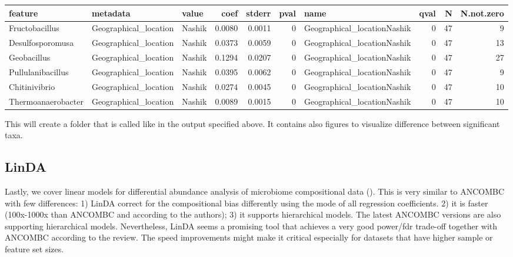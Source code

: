 \documentclass[
]{book}
\begin{document}
\begin{tabular}{l|l|l|r|r|r|l|r|r|r}
\hline
feature & metadata & value & coef & stderr & pval & name & qval & N & N.not.zero\\
\hline
Fructobacillus & Geographical\_location & Nashik & 0.0080 & 0.0011 & 0 & Geographical\_locationNashik & 0 & 47 & 9\\
\hline
Desulfosporomusa & Geographical\_location & Nashik & 0.0373 & 0.0059 & 0 & Geographical\_locationNashik & 0 & 47 & 13\\
\hline
Geobacillus & Geographical\_location & Nashik & 0.1294 & 0.0207 & 0 & Geographical\_locationNashik & 0 & 47 & 27\\
\hline
Pullulanibacillus & Geographical\_location & Nashik & 0.0395 & 0.0062 & 0 & Geographical\_locationNashik & 0 & 47 & 9\\
\hline
Chitinivibrio & Geographical\_location & Nashik & 0.0274 & 0.0045 & 0 & Geographical\_locationNashik & 0 & 47 & 10\\
\hline
Thermoanaerobacter & Geographical\_location & Nashik & 0.0089 & 0.0015 & 0 & Geographical\_locationNashik & 0 & 47 & 10\\
\hline
\end{tabular}

This will create a folder that is called like in the output specified
above. It contains also figures to visualize difference between
significant taxa.

\hypertarget{linda}{%
\subsection{LinDA}\label{linda}}

Lastly, we cover linear models for differential abundance analysis of
microbiome compositional data (\citet{Zhou2022}). This is very similar to
ANCOMBC with few differences: 1) LinDA correct for the compositional
bias differently using the mode of all regression coefficients. 2) it
is faster (100x-1000x than ANCOMBC and according to the authors); 3)
it supports hierarchical models. The latest ANCOMBC versions are also
supporting hierarchical models. Nevertheless, LinDA seems a promising
tool that achieves a very good power/fdr trade-off together with
ANCOMBC according to the review. The speed improvements might make it
critical especially for datasets that have higher sample or feature
set sizes.
\end{document}
